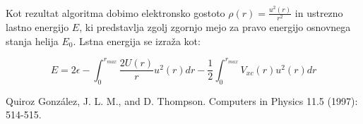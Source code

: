 \documentclass[a4paper]{article}
\newcommand{\half}{\frac{1}{2}}
\begin{document}
    Kot rezultat algoritma dobimo elektronsko gostoto $\rho(r) = \frac{u^2(r)}{r^2}$ in ustrezno lastno energijo $E$,
    ki predstavlja zgolj zgornjo mejo za pravo energijo osnovnega stanja helija $E_0$.
    Lstna energija se izraža kot:

    \begin{equation}\label{eq10}
    E = 2\epsilon - \int_0^{r_{max}} \frac{2U(r)}{r} u^2(r) dr - \half \int_0^{r_{max}} V_{xc}(r) u^2(r) dr
    \end{equation}

    \iffalse
    \begin{figure}
        \centering
        \texttt{[image: slika1.pdf]}
        \caption{Energije verige preračunane na delec. Najnižja vrednost, do katere pridemo na grafu je $E_0/n \approx -1.767$}
        \label{slika1}
    \end{figure}

    \begin{figure}
        \centering
        \begin{subfigure}{\textwidth}
            \texttt{[image: slika3a.pdf]}
        \end{subfigure}
        \begin{subfigure}{\textwidth}
            \texttt{[image: slika3b.pdf]}
        \end{subfigure}
        \caption{Prikaza matrik spinskih korelacij v osnovnem stanju dveh različno dolgih verig.}
        \label{slika3}
    \end{figure}
    \fi

    \begin{thebibliography}{9}
        Quiroz González, J. L. M., and D. Thompson.
            Computers in Physics 11.5 (1997): 514-515.
    \end{thebibliography}
\end{document}
